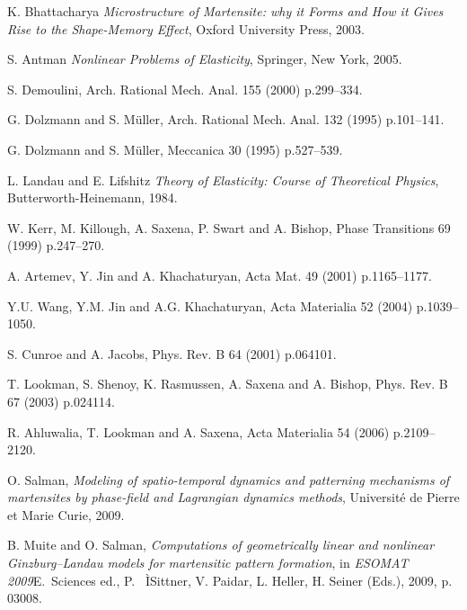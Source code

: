 \documentclass[twocolumn,amsmath,amssymb]{revtex4}
\begin{document}

%
\begin{thebibliography}{22}
\providecommand{\natexlab}[1]{#1}

K. Bhattacharya {\itshape Microstructure of {M}artensite: {}why it {F}orms and
  {H}ow it {G}ives {R}ise to the {S}hape-{M}emory {E}ffect},    Oxford
  University Press, 2003.

S. Antman {\itshape Nonlinear {P}roblems of {E}lasticity},    Springer, New
  York, 2005.

S. Demoulini, Arch. Rational Mech. Anal. 155 (2000) p.299--334.

G. Dolzmann and S. M\"{u}ller, Arch. Rational Mech. Anal. 132 (1995)
  p.101--141.

G. Dolzmann and S. M\"{u}ller, Meccanica 30 (1995) p.527--539.

L. Landau and E. Lifshitz {\itshape Theory of {E}lasticity: {C}ourse of
  {T}heoretical {P}hysics},    Butterworth-Heinemann, 1984.

W. Kerr, M. Killough, A. Saxena, P. Swart and A. Bishop, Phase Transitions 69
  (1999) p.247--270.

A. Artemev, Y. Jin and A. Khachaturyan, Acta Mat. 49 (2001) p.1165--1177.

Y.U. Wang, Y.M. Jin and A.G. Khachaturyan, Acta Materialia 52 (2004)
  p.1039--1050.

S. Cunroe and A. Jacobs, Phys. Rev. B 64 (2001) p.064101.

T. Lookman, S. Shenoy, K. Rasmussen, A. Saxena and A. Bishop, Phys. Rev. B 67
  (2003) p.024114.

R. Ahluwalia, T. Lookman and A. Saxena, Acta Materialia 54 (2006) p.2109--2120.

O. Salman, {\itshape Modeling of spatio-temporal dynamics and patterning
  mechanisms of martensites by phase-field and {L}agrangian dynamics methods},
  Universit\'e de Pierre et Marie Curie, 2009.

B. Muite and O. Salman, {\itshape Computations of geometrically linear and
  nonlinear {G}inzburg--{L}andau models for martensitic pattern formation}, in
  {\itshape ESOMAT 2009}E.~Sciences ed.,    P. \ ÌSittner, V. Paidar, L.
  Heller, H. Seiner (Eds.), 2009, p. 03008.


\end{thebibliography}
\end{document}
